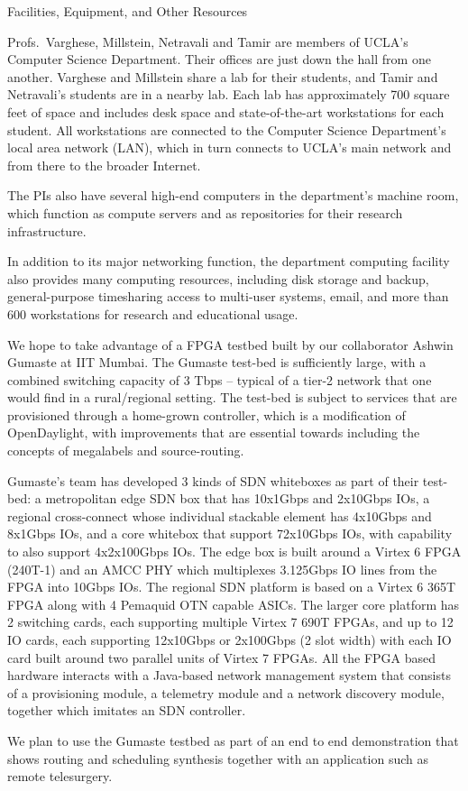 \documentclass[11pt]{article}
\begin{document}
\begin{center}
 \begin{large}
Facilities, Equipment, and Other Resources \\
\end{large}
\end{center}


Profs.\ Varghese, Millstein, Netravali and Tamir are members of UCLA's
Computer Science Department.  Their offices are just down the hall from one another.  Varghese and Millstein share a lab for their students, and Tamir and Netravali's students are in a nearby lab.  Each lab has
approximately 700 square feet of space and
includes desk space and state-of-the-art workstations for each
student.
All workstations are
connected to the Computer Science Department's local area network (LAN),
which in turn connects to UCLA's main network and from there to the broader Internet. 

The PIs also have several high-end computers in the
department's machine room, which function as compute servers and as
repositories for their research infrastructure.


In addition to its major
networking function, the department computing facility also provides many
computing resources, including disk storage and backup, general-purpose timesharing access to multi-user systems, email, and more than 600 workstations for research
and educational usage.

We hope to take advantage of a FPGA testbed built by our collaborator Ashwin Gumaste at IIT Mumbai. The Gumaste test-bed is sufficiently large, with a combined switching capacity of 3 Tbps – typical of a tier-2 network that one would find in a rural/regional setting. The test-bed is subject to services that are provisioned through a home-grown controller, which is a modification of OpenDaylight, with improvements that are essential towards including the concepts of megalabels and source-routing. 

Gumaste's team has developed 3 kinds of SDN whiteboxes as part of their test-bed: a metropolitan edge SDN box that has 10x1Gbps and 2x10Gbps IOs, a regional cross-connect whose individual stackable element has 4x10Gbps and 8x1Gbps IOs, and a core whitebox that support 72x10Gbps IOs, with capability to also support 4x2x100Gbps IOs. The edge box is built around a Virtex 6 FPGA (240T-1) and an AMCC PHY which multiplexes 3.125Gbps IO lines from the FPGA into 10Gbps IOs. The regional SDN platform is based on a Virtex 6 365T FPGA along with 4 Pemaquid OTN capable ASICs. The larger core platform has 2 switching cards, each supporting multiple Virtex 7 690T FPGAs, and up to 12 IO cards, each supporting 12x10Gbps or 2x100Gbps (2 slot width) with each IO card built around two parallel units of Virtex 7 FPGAs. All the FPGA based hardware interacts with a Java-based network management system that consists of a provisioning module, a telemetry module and a network discovery module, together which imitates an SDN controller. 

We plan to use the Gumaste testbed as part of an end to end demonstration that shows routing and scheduling synthesis together with an application such as remote telesurgery.
\end{document}
